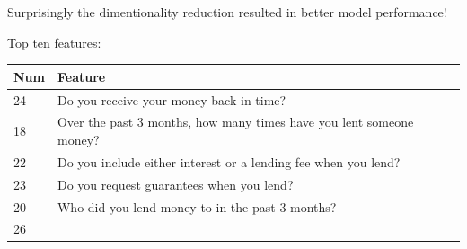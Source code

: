 Surprisingly the dimentionality reduction resulted in better model
performance!

Top ten features:

\begin{longtable}[]{@{}ll@{}}
\toprule
\begin{minipage}[b]{0.05\columnwidth}\raggedright
Num\strut
\end{minipage} & \begin{minipage}[b]{0.89\columnwidth}\raggedright
Feature\strut
\end{minipage}\tabularnewline
\midrule
\endhead
\begin{minipage}[t]{0.05\columnwidth}\raggedright
24\strut
\end{minipage} & \begin{minipage}[t]{0.89\columnwidth}\raggedright
Do you receive your money back in time?\strut
\end{minipage}\tabularnewline
\begin{minipage}[t]{0.05\columnwidth}\raggedright
18\strut
\end{minipage} & \begin{minipage}[t]{0.89\columnwidth}\raggedright
Over the past 3 months, how many times have you lent someone
money?\strut
\end{minipage}\tabularnewline
\begin{minipage}[t]{0.05\columnwidth}\raggedright
22\strut
\end{minipage} & \begin{minipage}[t]{0.89\columnwidth}\raggedright
Do you include either interest or a lending fee when you lend?\strut
\end{minipage}\tabularnewline
\begin{minipage}[t]{0.05\columnwidth}\raggedright
23\strut
\end{minipage} & \begin{minipage}[t]{0.89\columnwidth}\raggedright
Do you request guarantees when you lend?\strut
\end{minipage}\tabularnewline
\begin{minipage}[t]{0.05\columnwidth}\raggedright
20\strut
\end{minipage} & \begin{minipage}[t]{0.89\columnwidth}\raggedright
Who did you lend money to in the past 3 months?\strut
\end{minipage}\tabularnewline
\begin{minipage}[t]{0.05\columnwidth}\raggedright
26\strut
\end{minipage} & \begin{minipage}[t]{0.89\columnwidth}\raggedright

\end{minipage}
\end{longtable}
